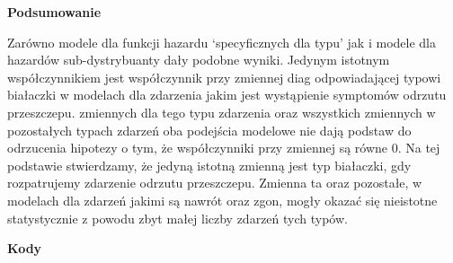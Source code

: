 \documentclass[]{article}
\begin{document}
\vspace{10pt}

\textbf{Podsumowanie}

Zarówno modele dla funkcji hazardu `specyficznych dla typu' jak i modele
dla hazardów sub-dystrybuanty dały podobne wyniki. Jedynym istotnym
współczynnikiem jest współczynnik przy zmiennej \textsf{diag}
odpowiadającej typowi białaczki w modelach dla zdarzenia jakim jest
wystąpienie symptomów odrzutu przeszczepu. 
zmiennych dla tego typu zdarzenia oraz wszystkich zmiennych w
pozostałych typach zdarzeń oba podejścia modelowe nie dają podstaw do
odrzucenia hipotezy o tym, że współczynniki przy zmiennej są równe 0. Na
tej podstawie stwierdzamy, że jedyną istotną zmienną jest typ białaczki,
gdy rozpatrujemy zdarzenie odrzutu przeszczepu. Zmienna ta oraz
pozostałe, w modelach dla zdarzeń jakimi są nawrót oraz zgon, mogły
okazać się nieistotne statystycznie z powodu zbyt małej liczby zdarzeń
tych typów.

\newpage
\small
\textbf{Kody}
\end{document}
